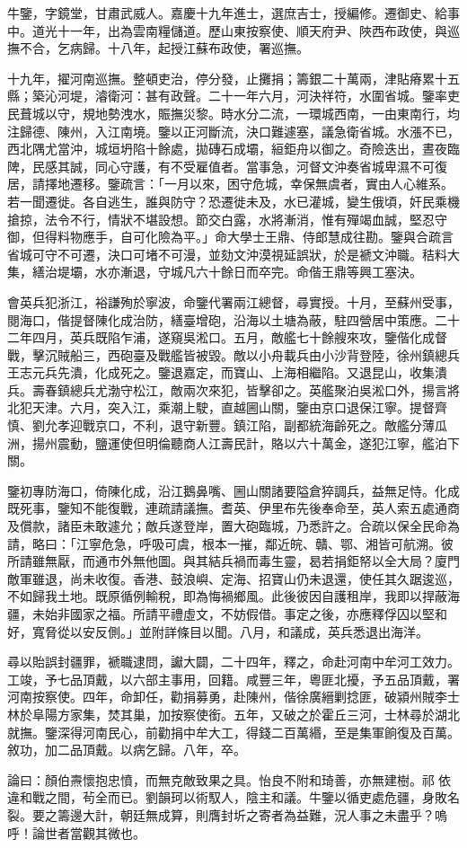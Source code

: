 \begin{pinyinscope}
牛鑒，字鏡堂，甘肅武威人。嘉慶十九年進士，選庶吉士，授編修。遷御史、給事中。道光十一年，出為雲南糧儲道。歷山東按察使、順天府尹、陜西布政使，與巡撫不合，乞病歸。十八年，起授江蘇布政使，署巡撫。

十九年，擢河南巡撫。整頓吏治，停分發，止攤捐；籌銀二十萬兩，津貼瘠累十五縣；築沁河堤，濬衛河：甚有政聲。二十一年六月，河決祥符，水圍省城。鑒率吏民葺城以守，規地勢洩水，賑撫災黎。時水分二流，一環城西南，一由東南行，均注歸德、陳州，入江南境。鑒以正河斷流，決口難遽塞，議急衛省城。水漲不已，西北隅尤當沖，城垣坍陷十餘處，拋磚石成壩，絙鉅舟以御之。奇險迭出，晝夜臨陴，民感其誠，同心守護，有不受雇值者。當事急，河督文沖奏省城卑濕不可復居，請擇地遷移。鑒疏言：「一月以來，困守危城，幸保無虞者，實由人心維系。若一聞遷徙。各自逃生，誰與防守？恐遷徙未及，水已灌城，變生俄頃，奸民乘機搶掠，法令不行，情狀不堪設想。節交白露，水將漸消，惟有殫竭血誠，堅忍守御，但得料物應手，自可化險為平。」命大學士王鼎、侍郎慧成往勘。鑒與合疏言省城可守不可遷，決口可堵不可漫，並劾文沖漠視延誤狀，於是褫文沖職。秸料大集，繕治堤壩，水亦漸退，守城凡六十餘日而卒完。命偕王鼎等興工塞決。

會英兵犯浙江，裕謙殉於寧波，命鑒代署兩江總督，尋實授。十月，至蘇州受事，閱海口，偕提督陳化成治防，繕臺增砲，沿海以土塘為蔽，駐四營居中策應。二十二年四月，英兵既陷乍浦，遂窺吳淞口。五月，敵艦七十餘艘來攻，鑒偕化成督戰，擊沉賊船三，西砲臺及戰艦皆被毀。敵以小舟載兵由小沙背登陸，徐州鎮總兵王志元兵先潰，化成死之。鑒退嘉定，而寶山、上海相繼陷。又退昆山，收集潰兵。壽春鎮總兵尤渤守松江，敵兩次來犯，皆擊卻之。英艦聚泊吳淞口外，揚言將北犯天津。六月，突入江，乘潮上駛，直越圌山關，鑒由京口退保江寧。提督齊慎、劉允孝迎戰京口，不利，退守新豐。鎮江陷，副都統海齡死之。敵艦分薄瓜洲，揚州震動，鹽運使但明倫聽商人江壽民計，賂以六十萬金，遂犯江寧，艦泊下關。

鑒初專防海口，倚陳化成，沿江鵝鼻嘴、圌山關諸要隘倉猝調兵，益無足恃。化成既死事，鑒知不能復戰，連疏請議撫。耆英、伊里布先後奉命至，英人索五處通商及償款，諸臣未敢遽允；敵兵遂登岸，置大砲臨城，乃悉許之。合疏以保全民命為請，略曰：「江寧危急，呼吸可虞，根本一摧，鄰近皖、贛、鄂、湘皆可航溯。彼所請雖無厭，而通市外無他圖。與其結兵禍而毒生靈，曷若捐鉅帑以全大局？廈門敵軍雖退，尚未收復。香港、鼓浪嶼、定海、招寶山仍未退還，使任其久踞逡巡，不如歸我土地。既原循例輸稅，即為悔禍鄉風。此後彼因自護租岸，我即以捍蔽海疆，未始非國家之福。所請平禮虛文，不妨假借。事定之後，亦應釋俘囚以堅和好，寬脅從以安反側。」並附詳條目以聞。八月，和議成，英兵悉退出海洋。

尋以貽誤封疆罪，褫職逮問，讞大闢，二十四年，釋之，命赴河南中牟河工效力。工竣，予七品頂戴，以六部主事用，回籍。咸豐三年，粵匪北擾，予五品頂戴，署河南按察使。四年，命卸任，勸捐募勇，赴陳州，偕徐廣縉剿捻匪，破潁州賊李士林於阜陽方家集，焚其巢，加按察使銜。五年，又破之於霍丘三河，士林尋於湖北就撫。鑒深得河南民心，前勸捐中牟大工，得錢二百萬緡，至是集軍餉復及百萬。敘功，加二品頂戴。以病乞歸。八年，卒。

論曰：顏伯燾懷抱忠憤，而無克敵致果之具。怡良不附和琦善，亦無建樹。祁依違和戰之間，茍全而已。劉韻珂以術馭人，陰主和議。牛鑒以循吏處危疆，身敗名裂。要之籌邊大計，朝廷無成算，則膺封圻之寄者為益難，況人事之未盡乎？嗚呼！論世者當觀其微也。


\end{pinyinscope}